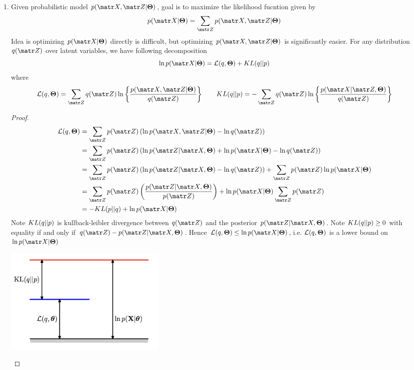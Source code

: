 \documentclass[11pt]{article}
\begin{document}
\begin{enumerate}
    \item Given probabilistic model $p(\bX, \bZ | \bTheta)$, goal is to maximize the likelihood fucntion given by 
    \[
        p(\bX | \bTheta) = \sum_{\bZ} p(\bX, \bZ | \bTheta)    
    \]
    Idea is optimizing $p(\bX | \bTheta)$ directly is difficult, but optimizing $p(\bX, \bZ | \bTheta)$ is significantly easier. For any distribution $q(\bZ)$ over latent variables, we have following decomposition 
    \[
        \ln p(\bX | \bTheta) = \calL(q, \bTheta) + \kl{q}{p}
    \]
    where 
    \[
        \calL(q,\bTheta) = \sum_{\bZ} q(\bZ) \ln \left\{ \frac{p(\bX, \bZ | \bTheta)}{q(\bZ)} \right\}
        \qquad 
        \kl{q}{p} = - \sum_{\bZ} q(\bZ) \ln \left\{ \frac{p(\bX | \bZ, \bTheta)}{q(\bZ)} \right\}
    \]
    \begin{proof}
        \begin{align*}
            \calL(q, \bTheta)
            &= \sum_{\bZ} p(\bZ) \left(  \ln p(\bX, \bZ | \bTheta) - \ln q(\bZ) \right) \\ 
            &= \sum_{\bZ} p(\bZ) \left(  \ln p(\bZ | \bX, \bTheta) + \ln p(\bX | \bTheta) - \ln q(\bZ) \right) \\
            &= \sum_{\bZ} p(\bZ) \left(  \ln p(\bZ | \bX, \bTheta) - \ln q(\bZ) \right) + \sum_{\bZ} p(\bZ) \ln p(\bX | \bTheta) \\
            &= \sum_{\bZ} p(\bZ) \left( \frac{p(\bZ |\bX, \bTheta)}{p(\bZ)} \right) + \ln p(\bX | \bTheta) \sum_{\bZ} p(\bZ) \\
            &= -\kl{p}{q} + \ln p(\bX | \bTheta)
        \end{align*}
        Note $KL(q || p)$ is kullback-leibler divergence between $q(\bZ)$ and the posterior $p(\bZ | \bX, \bTheta)$. Note $KL(q || p) \geq 0$ with equality if and only if $q(\bZ) - p(\bZ | \bX, \bTheta)$.  Hence $\calL(q, \bTheta) \leq \ln p(\bX | \bTheta)$, i.e. $\mathcal{L}(q,\boldsymbol{\Theta})$ is a lower bound on $\ln p(\bX | \bTheta)$
        \begin{center}
            \includegraphics[width=8cm]{kl_decomposition.png}
        \end{center}
    \end{proof}
\end{enumerate}
 
 
\end{document}

